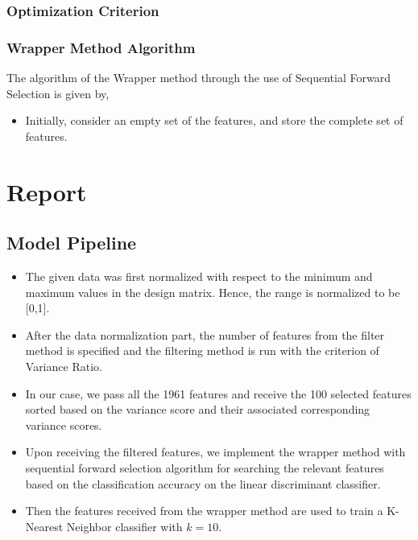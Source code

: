 \documentclass[12pt,twoside,a4paper]{article}
\begin{document}
\subsubsection*{Optimization Criterion}
    

\subsubsection*{Wrapper Method Algorithm}
The algorithm of the Wrapper method through the use of Sequential Forward Selection is given by,
\begin{itemize}
    \item Initially, consider an empty set of the features, and store the complete set of features.
\end{itemize}

\section{Report}

\subsection{Model Pipeline}
\begin{itemize}
    \item The given data was first normalized with respect to the minimum and maximum values in the design matrix. Hence, the range is normalized to be [0,1].
    \item After the data normalization part, the number of features from the filter method is specified and the filtering method is run with the criterion of Variance Ratio.
    \item In our case, we pass all the 1961 features and receive the 100 selected features sorted based on the variance score and their associated corresponding variance scores.
    \item Upon receiving the filtered features, we implement the wrapper method with sequential forward selection algorithm for searching the relevant features based on the classification accuracy on the linear discriminant classifier.
    \item Then the features received from the wrapper method are used to train a K-Nearest Neighbor classifier with $k=10$.
\end{itemize}
\end{document}

